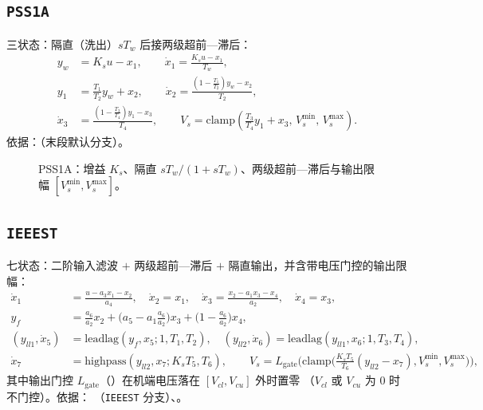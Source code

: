 \subsection{\texttt{PSS1A}}
三状态：隔直（洗出）$sT_w$ 后接两级超前—滞后：
\begin{align}
 y_w&=K_s u-x_1,\qquad \dot x_1=\frac{K_s u-x_1}{T_w},\\
 y_1&=\frac{T_1}{T_2}y_w+x_2,\qquad \dot x_2=\frac{\left(1-\tfrac{T_1}{T_2}\right)y_w-x_2}{T_2},\\
 \dot x_3&=\frac{\left(1-\tfrac{T_3}{T_4}\right)y_1-x_3}{T_4},\qquad
 V_s=\mathrm{clamp}\!\left(\frac{T_3}{T_4}y_1+x_3,\,V_s^{\min},\,V_s^{\max}\right).
\end{align}
依据：（末段默认分支）。

\begin{figure}[H]
\centering
{}
\caption{PSS1A：增益 $K_s$、隔直 $sT_w/(1+sT_w)$、两级超前—滞后与输出限幅 $[V_s^{\min},V_s^{\max}]$。}
\label{fig:pss-pss1a}
\end{figure}

\subsection{\texttt{IEEEST}}
七状态：二阶输入滤波 $+$ 两级超前—滞后 $+$ 隔直输出，并含带电压门控的输出限幅：
\begin{align}
 \dot x_1&=\frac{u-a_3 x_1-x_2}{a_4},\quad \dot x_2=x_1,\quad
 \dot x_3=\frac{x_2-a_1 x_3-x_4}{a_2},\quad \dot x_4=x_3,\\
 y_f&=\frac{a_6}{a_2}x_2+\Big(a_5-a_1\frac{a_6}{a_2}\Big)x_3+\Big(1-\frac{a_6}{a_2}\Big)x_4,\\
 (y_{ll1},\dot x_5)&=\mathrm{leadlag}(y_f,x_5;1,T_1,T_2),\quad
 (y_{ll2},\dot x_6)=\mathrm{leadlag}(y_{ll1},x_6;1,T_3,T_4),\\
 \dot x_7&=\text{highpass}(y_{ll2},x_7;K_sT_5,T_6),\qquad
 V_s=L_{\mathrm{gate}}\!\Big(\mathrm{clamp}\big(\tfrac{K_sT_5}{T_6}(y_{ll2}-x_7),V_s^{\min},V_s^{\max}\big)\Big),
\end{align}
其中输出门控 $L_{\mathrm{gate}}$（）在机端电压落在 $[V_{cl},V_{cu}]$ 外时置零
（$V_{cl}$ 或 $V_{cu}$ 为 0 时不门控）。依据：
（\texttt{IEEEST} 分支）、。

